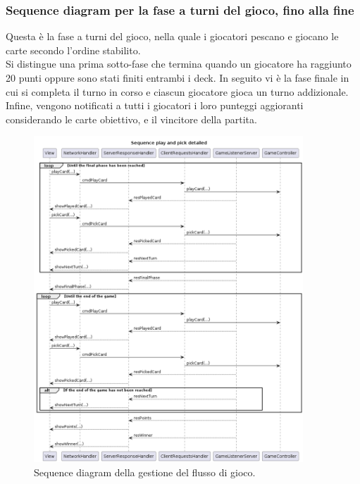 \documentclass[12pt]{article}
\begin{document}
\subsubsection{Sequence diagram per la fase a turni del gioco, fino alla fine}
Questa è la fase a turni del gioco, nella quale i giocatori pescano e giocano le carte secondo l'ordine stabilito.
\\
Si distingue una prima sotto-fase che termina quando un giocatore ha raggiunto 20 punti oppure sono stati finiti entrambi i deck. In seguito vi è la fase finale in cui si completa il turno in corso e ciascun giocatore gioca un turno addizionale.
\\
Infine, vengono notificati a tutti i giocatori i loro punteggi aggioranti considerando le carte obiettivo, e il vincitore della partita.
\begin{figure}[H]
  \centering
  \includegraphics[width=0.9\textwidth]{img/sequenceTillTheEndDetailed.png}
  \caption{Sequence diagram della gestione del flusso di gioco.}
  \label{fig:sequenceTillTheEnd}
\end{figure}
\end{document}

